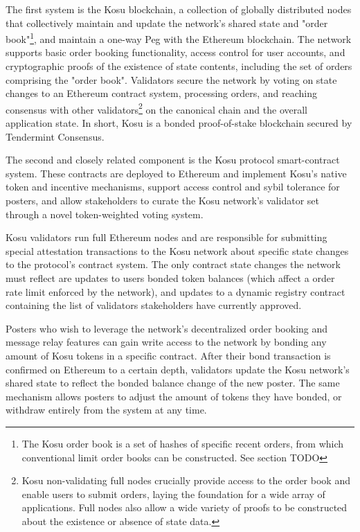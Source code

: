 \documentclass[10pt]{article}
\begin{document}
The first system is the Kosu blockchain, a collection of globally distributed nodes that collectively maintain and update the network’s shared state and "order book"\footnote{The Kosu order book is a set of hashes of specific recent orders, from which conventional limit order books can be constructed. See section TODO}, and maintain a one-way Peg with the Ethereum blockchain. The network supports basic order booking functionality, access control for user accounts, and cryptographic proofs of the existence of state contents, including the set of orders comprising the "order book". Validators secure the network by voting on state changes to an Ethereum contract system, processing orders, and reaching consensus with other validators\footnote{Kosu non-validating full nodes crucially provide access to the order book and enable users to submit orders, laying the foundation for a wide array of applications. Full nodes also allow a wide variety of proofs to be constructed about the existence or absence of state data.} on the canonical chain and the overall application state. In short, Kosu is a bonded proof-of-stake blockchain secured by Tendermint Consensus\cite{tendermint}.
\medskip

The second and closely related component is the Kosu protocol smart-contract system. These contracts are deployed to Ethereum and implement Kosu’s native token and incentive mechanisms, support access control and sybil tolerance for posters, and allow stakeholders to curate the Kosu network’s validator set through a novel token-weighted voting system.
\medskip

Kosu validators run full Ethereum nodes and are responsible for submitting special attestation transactions to the Kosu network about specific state changes to the protocol’s contract system. The only contract state changes the network must reflect are updates to users bonded token balances (which affect a order rate limit enforced by the network), and updates to a dynamic registry contract containing the list of validators stakeholders have currently approved. 
\medskip

Posters who wish to leverage the network’s decentralized order booking and message relay features can gain write access to the network by bonding any amount of Kosu tokens in a specific contract. After their bond transaction is confirmed on Ethereum to a certain depth, validators update the Kosu network's shared state to reflect the bonded balance change of the new poster. The same mechanism allows posters to adjust the amount of tokens they have bonded, or withdraw entirely from the system at any time.
\medskip
\end{document}
